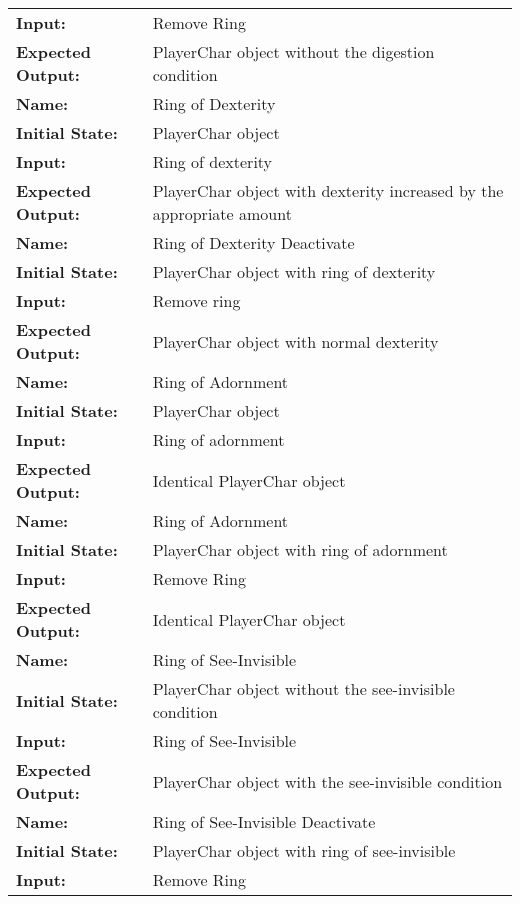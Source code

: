 \documentclass[12pt, titlepage]{article}
\begin{document}
\begin{center}
\begin{longtable}{ l | p{10cm} }
				\textbf{Input:} & Remove Ring\\
				\textbf{Expected Output:} & PlayerChar object without the digestion condition\\[0.6em]
				\hline
				\rule{0pt}{1.5em}\textbf{Name:} & Ring of Dexterity\\
				\textbf{Initial State:} & PlayerChar object\\
				\textbf{Input:} & Ring of dexterity\\
				\textbf{Expected Output:} & PlayerChar object with dexterity increased by the appropriate amount\\[0.6em]
				\hline
				\rule{0pt}{1.5em}\textbf{Name:} & Ring of Dexterity Deactivate\\
				\textbf{Initial State:} & PlayerChar object with ring of dexterity\\
				\textbf{Input:} & Remove ring\\
				\textbf{Expected Output:} & PlayerChar object with normal dexterity\\[0.6em]
				\hline
				\rule{0pt}{1.5em}\textbf{Name:} & Ring of Adornment\\
				\textbf{Initial State:} & PlayerChar object\\
				\textbf{Input:} & Ring of adornment\\
				\textbf{Expected Output:} & Identical PlayerChar object\\[0.6em]
				\hline
				\rule{0pt}{1.5em}\textbf{Name:} & Ring of Adornment\\
				\textbf{Initial State:} & PlayerChar object with ring of adornment\\
				\textbf{Input:} & Remove Ring\\
				\textbf{Expected Output:} & Identical PlayerChar object\\[0.6em]
				\hline
				\rule{0pt}{1.5em}\textbf{Name:} & Ring of See-Invisible\\
				\textbf{Initial State:} & PlayerChar object without the see-invisible condition\\
				\textbf{Input:} & Ring of See-Invisible\\
				\textbf{Expected Output:} & PlayerChar object with the see-invisible condition\\[0.6em]
				\hline
				\rule{0pt}{1.5em}\textbf{Name:} & Ring of See-Invisible Deactivate\\
				\textbf{Initial State:} & PlayerChar object with ring of see-invisible\\
				\textbf{Input:} & Remove Ring\\

\end{longtable}
\end{center}
\end{document}
